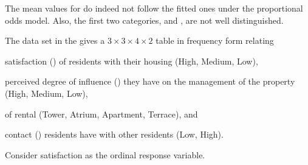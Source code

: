 \documentclass[10pt]{report}\usepackage[]{graphicx}\usepackage[]{color}
\newenvironment{knitrout}{}{} %
\renewenvironment{knitrout}{\small\renewcommand{\baselinestretch}{.85}}{} %
\begin{document}
\begin{Exercises}
\begin{ans}
\begin{knitrout}
\end{knitrout}
    The mean values for  do indeed not follow the fitted
    ones under the proportional odds model. Also, 
    the first two categories,  and ,
    are not well distinguished.
  \end{ans}
  

\exercise The data set  in the  gives a $3 \times 3 \times 4 \times 2$
table in frequency form relating
\begin{seriate}
 \item satisfaction () of residents with their housing (High, Medium, Low), 
 \item perceived degree of influence () they have on the management of the property (High, Medium, Low), 
 \item {} of rental (Tower, Atrium, Apartment, Terrace), and 
 \item contact () residents have with other residents (Low, High). 
\end{seriate}
Consider satisfaction as the ordinal response variable.

  \begin{enumerate*}


\end{enumerate*}
\end{Exercises}
\end{document}
